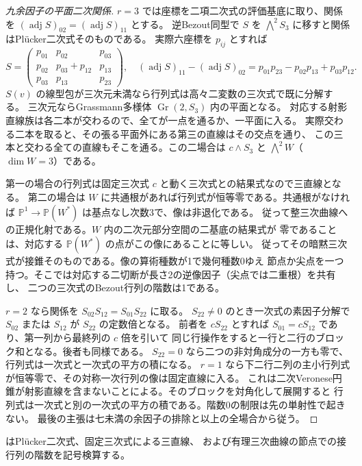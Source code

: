 \begin{proof}[九余因子の平面二次関係]
$r=3$ では座標を二項二次式の評価基底に取り、関係を
$(\operatorname{adj}S)_{02}=(\operatorname{adj}S)_{11}$ とする。
逆Bezout同型で $S$ を $\bigwedge^2 S_3$ に移すと関係はPlücker二次式そのものである。
実際六座標を $p_{ij}$ とすれば
\[
 S=\begin{pmatrix}p_{01}&p_{02}&p_{03}\\p_{02}&p_{03}+p_{12}&p_{13}\\p_{03}&p_{13}&p_{23}\end{pmatrix},
 \quad (\operatorname{adj}S)_{11}-(\operatorname{adj}S)_{02}
 =p_{01}p_{23}-p_{02}p_{13}+p_{03}p_{12}.
\]
$S(v)$ の線型包が三次元未満なら行列式は高々二変数の三次式で既に分解する。
三次元ならGrassmann多様体 $\operatorname{Gr}(2,S_3)$ 内の平面となる。
対応する射影直線族は各二本が交わるので、全てが一点を通るか、一平面に入る。
実際交わる二本を取ると、その張る平面外にある第三の直線はその交点を通り、
この三本と交わる全ての直線もそこを通る。この二場合は $c\wedge S_3$ と
$\bigwedge^2 W$（$\dim W=3$）である。

第一の場合の行列式は固定三次式 $c$ と動く三次式との結果式なので三直線となる。
第二の場合は $W$ に共通根があれば行列式が恒等零である。共通根がなければ
$\mathbb P^1\to\mathbb P(W^*)$ は基点なし次数3で、像は非退化である。
従って整三次曲線への正規化射である。$W$ 内の二次元部分空間の二基底の結果式が
零であることは、対応する $\mathbb P(W^*)$ の点がこの像にあることに等しい。
従ってその暗黙三次式が接錐そのものである。像の算術種数が1で幾何種数0ゆえ
節点か尖点を一つ持つ。そこでは対応する二切断が長さ2の逆像因子（尖点では二重根）を共有し、
二つの三次式のBezout行列の階数は1である。

$r=2$ なら関係を $S_{02}S_{12}=S_{01}S_{22}$ に取る。
$S_{22}\ne0$ のとき一次式の素因子分解で $S_{02}$ または $S_{12}$ が $S_{22}$ の定数倍となる。
前者を $c S_{22}$ とすれば $S_{01}=c S_{12}$ であり、第一列から最終列の $c$ 倍を引いて
同じ行操作をすると一行と二行のブロック和となる。後者も同様である。
$S_{22}=0$ なら二つの非対角成分の一方も零で、行列式は一次式と一次式の平方の積になる。
$r=1$ なら下二行二列の主小行列式が恒等零で、その対称一次行列の像は固定直線に入る。
これは二次Veronese円錐が射影直線を含まないことによる。そのブロックを対角化して展開すると
行列式は一次式と別の一次式の平方の積である。階数0の制限は先の単射性で起きない。
最後の主張は七未満の余因子の排除と以上の全場合から従う。
\end{proof}

 はPlücker二次式、固定三次式による三直線、
および有理三次曲線の節点での接行列の階数を記号検算する。
